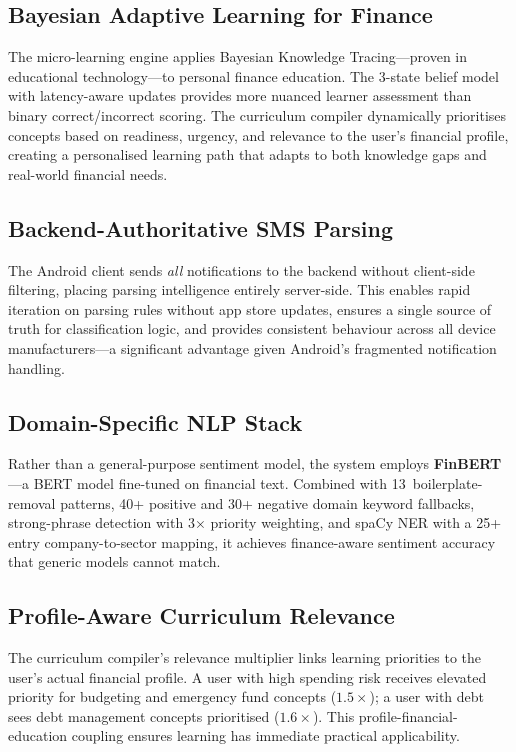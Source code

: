 \documentclass[conference]{IEEEtran}
\begin{document}
\subsection{Bayesian Adaptive Learning for Finance}
The micro-learning engine applies Bayesian Knowledge Tracing---proven in educational technology---to personal finance education. The 3-state belief model with latency-aware updates provides more nuanced learner assessment than binary correct/incorrect scoring. The curriculum compiler dynamically prioritises concepts based on readiness, urgency, and relevance to the user's financial profile, creating a personalised learning path that adapts to both knowledge gaps and real-world financial needs.

\subsection{Backend-Authoritative SMS Parsing}
The Android client sends \emph{all} notifications to the backend without client-side filtering, placing parsing intelligence entirely server-side. This enables rapid iteration on parsing rules without app store updates, ensures a single source of truth for classification logic, and provides consistent behaviour across all device manufacturers---a significant advantage given Android's fragmented notification handling.

\subsection{Domain-Specific NLP Stack}
Rather than a general-purpose sentiment model, the system employs \textbf{FinBERT}---a BERT model fine-tuned on financial text. Combined with 13~boilerplate-removal patterns, 40+ positive and 30+ negative domain keyword fallbacks, strong-phrase detection with 3$\times$ priority weighting, and spaCy NER with a 25+ entry company-to-sector mapping, it achieves finance-aware sentiment accuracy that generic models cannot match.

\subsection{Profile-Aware Curriculum Relevance}
The curriculum compiler's relevance multiplier links learning priorities to the user's actual financial profile. A user with high spending risk receives elevated priority for budgeting and emergency fund concepts ($1.5\times$); a user with debt sees debt management concepts prioritised ($1.6\times$). This profile-financial-education coupling ensures learning has immediate practical applicability.
\end{document}
